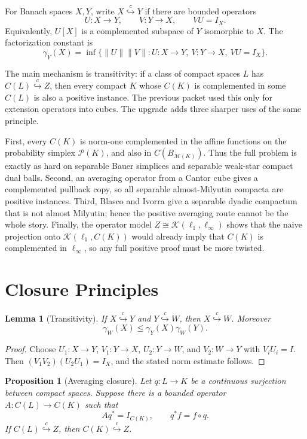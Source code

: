 \documentclass[11pt]{article}
\newtheorem{proposition}[theorem]{Proposition}
\newtheorem{lemma}[theorem]{Lemma}
\theoremstyle{definition}
\theoremstyle{remark}
\newcommand{\C}{C}
\newcommand{\Pp}{\mathcal P}
\newcommand{\M}{\mathcal M}
\newcommand{\Kop}{\mathcal K}
\newcommand{\Id}{I}
\newcommand{\hookc}{\stackrel{c}{\hookrightarrow}}
\begin{document}
For Banach spaces \(X,Y\), write \(X\hookc Y\) if there are bounded operators
\[
        U:X\to Y,\qquad V:Y\to X,\qquad VU=\Id_X.
\]
Equivalently, \(U[X]\) is a complemented subspace of \(Y\) isomorphic to
\(X\).  The factorization constant is
\[
 \gamma_Y(X)=\inf\{\|U\|\|V\|:U:X\to Y,\ V:Y\to X,\ VU=\Id_X\}.
\]

The main mechanism is transitivity: if a class of compact spaces \(L\) has
\(\C(L)\hookc Z\), then every compact \(K\) whose \(\C(K)\) is complemented
in some \(\C(L)\) is also a positive instance.  The previous packet used
this only for extension operators into cubes.  The upgrade adds three sharper
uses of the same principle.

First, every \(\C(K)\) is norm-one complemented in the affine functions on
the probability simplex \(\Pp(K)\), and also in \(\C(B_{\M(K)})\).  Thus the
full problem is exactly as hard on separable Bauer simplices and separable
weak-star compact dual balls.  Second, an averaging operator from a Cantor
cube gives a complemented pullback copy, so all separable almost-Milyutin
compacta are positive instances.  Third, Blasco and Ivorra give a separable
dyadic compactum that is not almost Milyutin; hence the positive averaging
route cannot be the whole story.  Finally, the operator model
\(Z\cong \Kop(\ell_1,\ell_\infty)\) shows that the naive projection onto
\(\Kop(\ell_1,\C(K))\) would already imply that \(\C(K)\) is complemented in
\(\ell_\infty\), so any full positive proof must be more twisted.

\section{Closure Principles}

\begin{lemma}[Transitivity]\label{lem:transitivity}
If \(X\hookc Y\) and \(Y\hookc W\), then \(X\hookc W\).  Moreover
\[
       \gamma_W(X)\leq \gamma_Y(X)\gamma_W(Y).
\]
\end{lemma}

\begin{proof}
Choose \(U_1:X\to Y\), \(V_1:Y\to X\), \(U_2:Y\to W\), and \(V_2:W\to Y\)
with \(V_iU_i=\Id\).  Then \((V_1V_2)(U_2U_1)=\Id_X\), and the stated norm
estimate follows.
\end{proof}

\begin{proposition}[Averaging closure]\label{prop:averaging}
Let \(q:L\to K\) be a continuous surjection between compact spaces.  Suppose
there is a bounded operator \(A:\C(L)\to\C(K)\) such that
\[
       A q^*=\Id_{\C(K)},\qquad q^*f=f\circ q.
\]
If \(\C(L)\hookc Z\), then \(\C(K)\hookc Z\).
\end{proposition}
\end{document}
